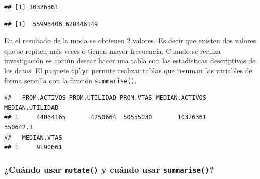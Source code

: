 \documentclass[letterpaper,]{book}
\newenvironment{Shaded}{\begin{snugshade}}{\end{snugshade}}
\newcommand{\DataTypeTok}[1]{\textcolor[rgb]{0.13,0.29,0.53}{#1}}
\newcommand{\KeywordTok}[1]{\textcolor[rgb]{0.13,0.29,0.53}{\textbf{#1}}}
\newcommand{\NormalTok}[1]{#1}
\newcommand{\OperatorTok}[1]{\textcolor[rgb]{0.81,0.36,0.00}{\textbf{#1}}}
\newcommand{\StringTok}[1]{\textcolor[rgb]{0.31,0.60,0.02}{#1}}
\begin{document}
\begin{verbatim}
## [1] 10326361
\end{verbatim}

\begin{Shaded}
\end{Shaded}

\begin{verbatim}
## [1]  55996406 628446149
\end{verbatim}

En el resultado de la moda se obtienen 2 valores. Es decir que existen dos valores que se repiten más veces o tienen mayor frecuencia. Cuando se realiza investigación es común desear hacer una tabla con las estadísticas descriptivas de los datos. El paquete \texttt{dplyr} permite realizar tablas que resuman las variables de forma sencilla con la función \texttt{summarise()}.

\begin{Shaded}
\end{Shaded}

\begin{verbatim}
##   PROM.ACTIVOS PROM.UTILIDAD PROM.VTAS MEDIAN.ACTIVOS MEDIAN.UTILIDAD
## 1     44064165       4250664  50555030       10326361        350642.1
##   MEDIAN.VTAS
## 1     9190661
\end{verbatim}

\hypertarget{cuando-usar-mutate-y-cuando-usar-summarise}{%
\subsubsection{\texorpdfstring{¿Cuándo usar \texttt{mutate()} y cuándo usar \texttt{summarise()}?}{¿Cuándo usar mutate() y cuándo usar summarise()?}}\label{cuando-usar-mutate-y-cuando-usar-summarise}}
\end{document}
